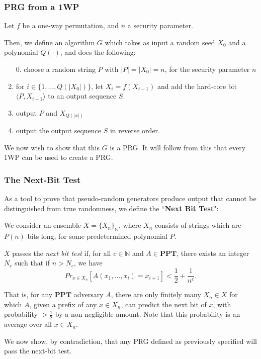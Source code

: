 \documentclass[11pt]{article}
\newcommand{\PPT}{\mathbf{PPT}}
\newcommand{\N}{\mathbb{N}}
\begin{document}
\subsubsection{PRG from a 1WP}
Let \(f\) be a one-way permutation, and \(n\) a security parameter.\smallskip

Then, we define an algorithm \(G\) which takes as input a random seed \(X_0\) and a polynomial \(Q(\cdot)\), and does the following:

\begin{enumerate}
\item [0. ] choose a random string \(P\) with \(|P|=|X_0| = n\), for the security parameter \(n\)
\item for \(i\in\{1,\ldots,Q(|X_0|)\}\), let \(X_i = f(X_{i-1})\) and add the hard-core bit \(\langle P, X_{i-1}\rangle\) to an output sequence \(S\).
\item output \(P\) and \(X_{Q(|x|)}\)
\item output the output sequence \(S\) in reverse order.
\end{enumerate}

We now wish to show that this \(G\) is a PRG. It will follow from this that every 1WP can be used to create a PRG.

\subsubsection{The Next-Bit Test}

As a tool to prove that pseudo-random generators produce output that cannot be distinguished from true randomness, we define the ``\textbf{Next Bit Test}":\medskip

We consider an ensemble \(X=\{X_n\}_\N\), where \(X_n\) consists of strings which are \(P(n)\) bits long, for some predetermined polynomial \(P\).

\(X\) passes the \emph{next bit test} if, for all \(c\in\N\) and \(A\in\PPT\), there exists an integer \(N_c\) such that if \(n>N_c\), we have
\[Pr_{x\in X_n}[A(x_1,\ldots,x_i) = x_{i+1}]<\frac{1}{2}+\frac{1}{n^c}.\]

That is, for any \(\PPT\) adversary \(A\), there are only finitely many \(X_n\in X\) for which \(A\), given a prefix of any \(x\in X_n\), can predict the next bit of \(x\), with probability \(>\frac{1}{2}\) by a non-negligible amount. Note that this probability is an average over all \(x\in X_n\).\bigskip

We now show, by contradiction, that any PRG defined as previously specified will pass the next-bit test.\smallskip
\end{document}
